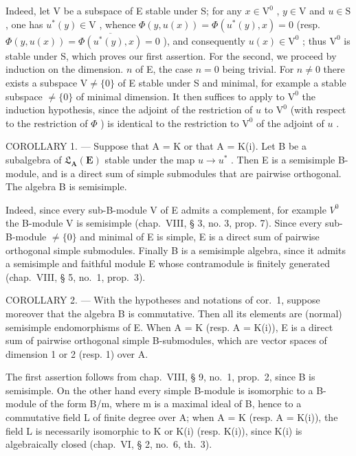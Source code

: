 Indeed, let V be a subspace of E stable under S; for any \(x \in \mathrm{V}^0\) , \(y \in \mathrm{V}\) and \(u \in \mathrm{S}\) , one has \(u^*(y) \in \mathrm{V}\) , whence \(\Phi(y, u(x)) = \Phi(u^*(y), x) = 0\) (resp. \(\Phi(y, u(x)) = \overline{\Phi(u^*(y), x)} = 0\) ), and consequently \(u(x) \in \mathrm{V}^0\) ; thus \(\mathrm{V}^0\) is stable under S, which proves our first assertion. For the second, we proceed by induction on the dimension. \(n\) of E, the case \(n = 0\) being trivial. For \(n \neq 0\) there exists a subspace \(\mathrm{V} \neq \{0\}\) of E stable under S and minimal, for example a stable subspace \(\neq \{0\}\) of minimal dimension. It then suffices to apply to \(\mathrm{V}^0\) the induction hypothesis, since the adjoint of the restriction of \(u\) to \(\mathrm{V}^0\) (with respect to the restriction of \(\Phi\) ) is identical to the restriction to \(\mathrm{V}^0\) of the adjoint of \(u\) .

COROLLARY 1. --- Suppose that A = K or that A = K(i). Let B be a subalgebra of \(\mathfrak{L}_{\mathbf{A}}(\mathbf{E})\) stable under the map \(u \to u^{*}\) . Then E is a semisimple B-module, and is a direct sum of simple submodules that are pairwise orthogonal. The algebra B is semisimple.

Indeed, since every sub-B-module V of E admits a complement, for example \(V^{0}\) the B-module V is semisimple (chap.~VIII, § 3, no. 3, prop. 7). Since every sub-B-module \(\neq\{0\}\) and minimal of E is simple, E is a direct sum of pairwise orthogonal simple submodules. Finally B is a semisimple algebra, since it admits a semisimple and faithful module E whose contramodule is finitely generated (chap.~VIII, § 5, no.~1, prop.~3).

COROLLARY 2. --- With the hypotheses and notations of cor.~1, suppose moreover that the algebra B is commutative. Then all its elements are (normal) semisimple endomorphisms of E. When A = K (resp. A = K(i)), E is a direct sum of pairwise orthogonal simple B-submodules, which are vector spaces of dimension 1 or 2 (resp. 1) over A.

The first assertion follows from chap.~VIII, § 9, no.~1, prop.~2, since B is semisimple. On the other hand every simple B-module is isomorphic to a B-module of the form B/m, where m is a maximal ideal of B, hence to a commutative field L of finite degree over A; when A = K (resp. A = K(i)), the field L is necessarily isomorphic to K or K(i) (resp. K(i)), since K(i) is algebraically closed (chap.~VI, § 2, no.~6, th.~3).

